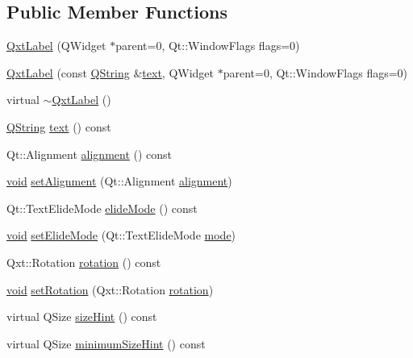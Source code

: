 \subsection*{Public Member Functions}
\begin{DoxyCompactItemize}
\item 
\hyperlink{class_qxt_label_ae348877724b31a69413b2f0a202e8afc}{Qxt\-Label} (Q\-Widget $\ast$parent=0, Qt\-::\-Window\-Flags flags=0)
\item 
\hyperlink{class_qxt_label_a7d669be99cdeb3d740c8fbb35ba5ebc9}{Qxt\-Label} (const \hyperlink{group___u_a_v_objects_plugin_gab9d252f49c333c94a72f97ce3105a32d}{Q\-String} \&\hyperlink{class_qxt_label_a62d0ce110fe3e51ea6ea82cd8e60d430}{text}, Q\-Widget $\ast$parent=0, Qt\-::\-Window\-Flags flags=0)
\item 
virtual \hyperlink{class_qxt_label_a8af8301d8b4915ca05226c880a8579da}{$\sim$\-Qxt\-Label} ()
\item 
\hyperlink{group___u_a_v_objects_plugin_gab9d252f49c333c94a72f97ce3105a32d}{Q\-String} \hyperlink{class_qxt_label_a8f9220c7ea31e43c153de02c9bea01bd}{text} () const 
\item 
Qt\-::\-Alignment \hyperlink{class_qxt_label_a21af1112d8146465122b4ad288402939}{alignment} () const 
\item 
\hyperlink{group___u_a_v_objects_plugin_ga444cf2ff3f0ecbe028adce838d373f5c}{void} \hyperlink{class_qxt_label_af42b44e49c5ce4b9e6180d215dfc9d4d}{set\-Alignment} (Qt\-::\-Alignment \hyperlink{class_qxt_label_a567b7e5e6a5ef51f72369198fd29b80f}{alignment})
\item 
Qt\-::\-Text\-Elide\-Mode \hyperlink{class_qxt_label_a7c3564be5b548072166adb8ffcb16b9e}{elide\-Mode} () const 
\item 
\hyperlink{group___u_a_v_objects_plugin_ga444cf2ff3f0ecbe028adce838d373f5c}{void} \hyperlink{class_qxt_label_afb1617cfd02bf28fa5d0203a8fd519e2}{set\-Elide\-Mode} (Qt\-::\-Text\-Elide\-Mode \hyperlink{glext_8h_a1e71d9c196e4683cc06c4b54d53f7ef5}{mode})
\item 
Qxt\-::\-Rotation \hyperlink{class_qxt_label_a1868b4f5b086819643cb7094c04cf8db}{rotation} () const 
\item 
\hyperlink{group___u_a_v_objects_plugin_ga444cf2ff3f0ecbe028adce838d373f5c}{void} \hyperlink{class_qxt_label_a436a8f604ddd04fb5cf9898e8dfbfa8b}{set\-Rotation} (Qxt\-::\-Rotation \hyperlink{class_qxt_label_afac17750ce1b4f63bf868dd239aeb2f2}{rotation})
\item 
virtual Q\-Size \hyperlink{class_qxt_label_ae78c28637f3cb64fc00843ba7830934b}{size\-Hint} () const 
\item 
virtual Q\-Size \hyperlink{class_qxt_label_af927d5ea6c1885b5ade5eeabd1efaec4}{minimum\-Size\-Hint} () const 
\end{DoxyCompactItemize}

